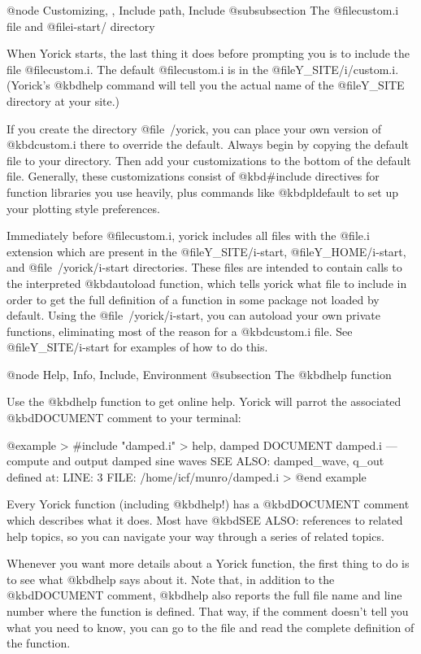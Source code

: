 {@node Customizing,  , Include path, Include
@subsubsection The @file{custom.i} file and @file{i-start/} directory

When Yorick starts, the last thing it does before prompting you is to
include the file @file{custom.i}.  The default @file{custom.i} is in the
@file{Y_SITE/i/custom.i}.  (Yorick's @kbd{help} command will tell
you the actual name of the @file{Y_SITE} directory at your site.)

If you create the directory @file{~/yorick}, you can place your own
version of @kbd{custom.i} there to override the default.  Always begin
by copying the default file to your directory.  Then add your
customizations to the bottom of the default file.  Generally, these
customizations consist of @kbd{#include} directives for function libraries
you use heavily, plus commands like @kbd{pldefault} to set up your
plotting style preferences.

Immediately before @file{custom.i}, yorick includes all files with the
@file{.i} extension which are present in the @file{Y_SITE/i-start},
@file{Y_HOME/i-start}, and @file{~/yorick/i-start} directories.  These
files are intended to contain calls to the interpreted @kbd{autoload}
function, which tells yorick what file to include in order to get the
full definition of a function in some package not loaded by default.
Using the @file{~/yorick/i-start}, you can autoload your own private
functions, eliminating most of the reason for a @kbd{custom.i} file.
See @file{Y_SITE/i-start} for examples of how to do this.


@node Help, Info, Include, Environment
@subsection The @kbd{help} function

Use the @kbd{help} function to get online help.  Yorick will parrot
the associated @kbd{DOCUMENT} comment to your terminal:

@example
> #include "damped.i"
> help, damped
  DOCUMENT damped.i --- compute and output damped sine waves
  SEE ALSO: damped_wave, q_out
defined at:   LINE: 3  FILE: /home/icf/munro/damped.i
>
@end example

Every Yorick function (including @kbd{help}!) has a @kbd{DOCUMENT}
comment which describes what it does.  Most have @kbd{SEE ALSO:}
references to related help topics, so you can navigate your way
through a series of related topics.

Whenever you want more details about a Yorick function, the first
thing to do is to see what @kbd{help} says about it.  Note that, in
addition to the @kbd{DOCUMENT} comment, @kbd{help} also reports the
full file name and line number where the function is defined.  That
way, if the comment doesn't tell you what you need to know, you can
go to the file and read the complete definition of the function.

}

